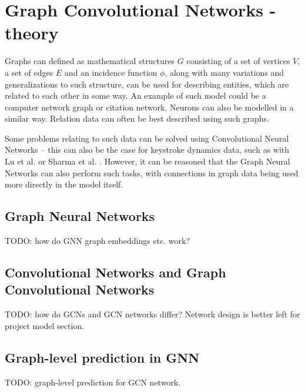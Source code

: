 
\chapter{Graph Convolutional Networks - theory}

Graphs can defined as mathematical structures $G$ consisting of a set of vertices $V$, a set of edges $E$ and an incidence function $\phi$, along with many variations and generalizations to such structure, can be used for describing entities, which are related to each other in some way. An example of such model could be a computer network graph or citation network. Neurons can also be modelled in a similar way. Relation data can often be best described using such graphs. \cite{Lesk2024}

Some problems relating to such data can be solved using Convolutional Neural Networks -- this can also be the case for keystroke dynamics data, such as with Lu et al. \cite{Lu2020} or Sharma et al. \cite{Shar2023}. However, it can be reasoned that the Graph Neural Networks can also perform such tasks, with connections in graph data being used more directly in the model itself.

\section{Graph Neural Networks}
TODO: how do GNN graph embeddings etc. work?

\section{Convolutional Networks and Graph Convolutional Networks}
TODO: how do GCNs and GCN networks differ? Network design is better left for project model section.

\section{Graph-level prediction in GNN}
TODO: graph-level prediction for GCN network.
